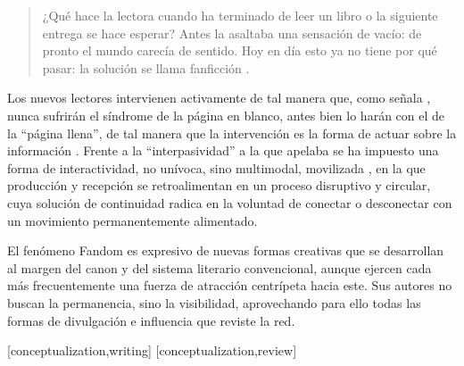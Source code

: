 \documentclass[spanish]{textolivre}
\begin{document}
\begin{quote}
    ¿Qué hace la lectora cuando ha terminado de leer un libro o la siguiente entrega se hace esperar? Antes la asaltaba una sensación de vacío: de pronto el mundo carecía de sentido. Hoy en día esto ya no tiene por qué pasar: la solución se llama fanficción \cite[p. 261]{bollmann_mujeres_2015}.
\end{quote}

Los nuevos lectores intervienen activamente de tal manera que, como señala \textcite{aira_continuacion_2019}, nunca sufrirán el síndrome de la página en blanco, antes bien lo harán con el de la “página llena”, de tal manera que la intervención es la forma de actuar sobre la información \cite{aira_continuacion_2019}. Frente a la “interpasividad” a la que apelaba \textcite{zizek_acoso_2011} se ha impuesto una forma de interactividad, no unívoca, sino multimodal, movilizada \cite{ferraris_movilizacion_2017}, en la que producción y recepción se retroalimentan en un proceso disruptivo y circular, cuya solución de continuidad radica en la voluntad de conectar o desconectar con un movimiento permanentemente alimentado.

El fenómeno Fandom es expresivo de nuevas formas creativas que se desarrollan al margen del canon y del sistema literario convencional, aunque ejercen cada más frecuentemente una fuerza de atracción centrípeta hacia este. Sus autores no buscan la permanencia, sino la visibilidad, aprovechando para ello todas las formas de divulgación e influencia que reviste la red.


\printbibliography\label{sec-bib}


\begin{contributors}
[conceptualization,writing]
[conceptualization,review]
\end{contributors}
\end{document}
